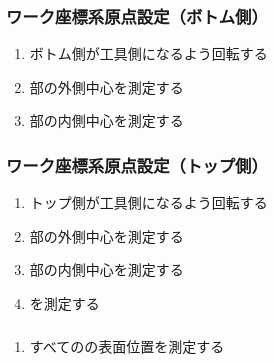 \subsubsection{ワーク座標系原点設定（ボトム側）}
\begin{enumerate}[label*=\sarrow]
\item ボトム側が工具側になるよう回転する
\item \BottomEndFace 部の外側中心を測定する
\item \BottomEndFace 部の内側中心を測定する
\end{enumerate}


\begin{figure}[h]%
\begin{Figbox}[valign=top]%
%
\setlength{\abovecaptionskip}{10pt}%
\end{Figbox}%
\end{figure}%


\subsubsection{ワーク座標系原点設定（トップ側）}
\begin{enumerate}[label*=\sarrow]
\item トップ側が工具側になるよう回転する
\item \TopEndFace 部の外側中心を測定する
\item \TopEndFace 部の内側中心を測定する
\item \KeywayCenter を測定する
\end{enumerate}

\subsubsection{\DimpleMeasurement}
\begin{enumerate}[label*=\sarrow]
\item すべての\Dimple の表面位置を測定する
\end{enumerate}


